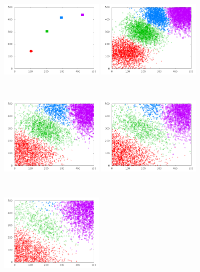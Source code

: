 \begin{figure}
\centering
    \includegraphics[width=5cm,height=5cm]{Trial1-0.png}
    \includegraphics[width=5cm,height=5cm]{Trial1-5000.png}
    \includegraphics[width=5cm,height=5cm]{Trial1-10000.png}
    \includegraphics[width=5cm,height=5cm]{Trial1-15000.png}
    \includegraphics[width=5cm,height=5cm]{Trial1-20000.png}

\end{figure}
